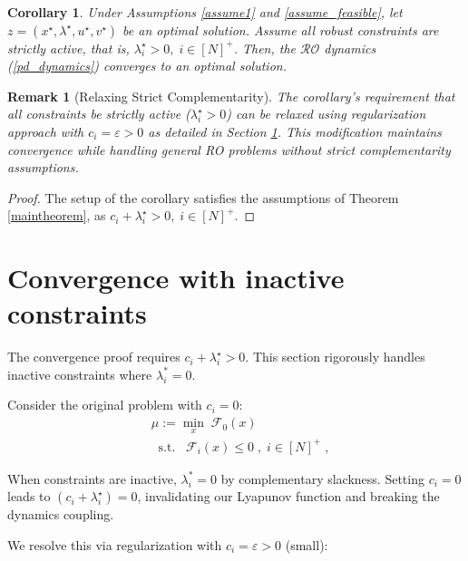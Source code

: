 \documentclass[journal,twoside,web]{ieeecolor}
\newcommand{\rev}[1]{#1}
\newtheorem{corollary}{Corollary}
\newtheorem{remark}{Remark}
\begin{document}
\begin{corollary}
Under Assumptions \ref{assume1} and \ref{assume_feasible}, let $z=(x^\star,\lambda^\star,u^\star,v^\star)$ be an optimal solution.
Assume all robust constraints are strictly active, that is, $\lambda_i^\star>0,\;i\in[N]^+$. Then, the $\mathcal{RO}$ dynamics (\ref{pd_dynamics}) converges to an optimal solution.
\end{corollary}

\begin{remark}[\rev{Relaxing Strict Complementarity}]
\rev{The corollary's requirement that all constraints be strictly active ($\lambda_i^\star > 0$) can be relaxed using
regularization approach with $c_i = \varepsilon > 0$ as detailed in Section \ref{perturbed_section_pddynamics}. This modification maintains convergence while handling general RO problems without strict complementarity assumptions.}
\end{remark}
\begin{proof}
The setup of the corollary satisfies the assumptions of Theorem \ref{maintheorem}, as $c_i+\lambda_i^\star>0,\;i\in[N]^+$.
\end{proof}

\section{Convergence with inactive constraints} \label{perturbed_section_pddynamics}

The convergence proof requires $c_i+\lambda_i^\star>0$. This section rigorously handles inactive constraints where $\lambda_i^* = 0$.

Consider the original problem with $c_i=0$:
\begin{align} \label{mu_0}
&\mu:=\underset{x}{\min} \; \mathcal{F}_0(x)\\
&\;\;\text{s.t.}\;\;\;\mathcal{F}_i(x)\leq 0\;,\;i\in[N]^+\;,\nonumber
\end{align}

When constraints are inactive, $\lambda_i^* = 0$ by complementary slackness. Setting $c_i = 0$ leads to $(c_i+\lambda_i^\star)=0$, invalidating our Lyapunov function and breaking the dynamics coupling.

We resolve this via regularization with $c_i=\varepsilon>0$ (small):
\end{document}

